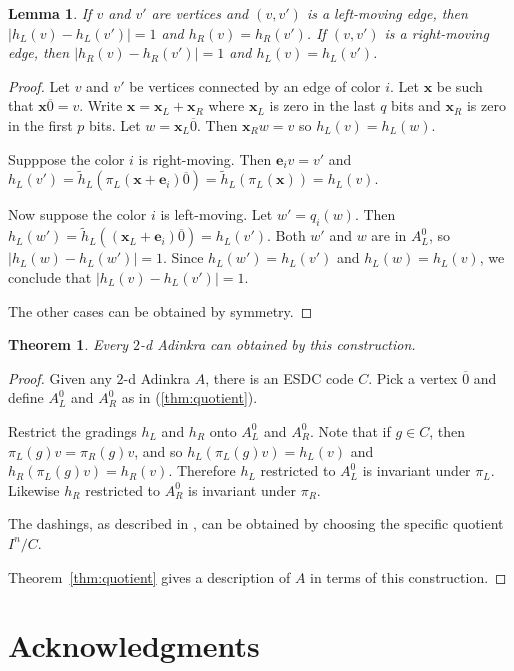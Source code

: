 \documentclass[12pt,twoside,singlespace]{article}
\numberwithin{equation}{section}
\newtheorem{thm}[equation]{Theorem}
\newtheorem{lem}[equation]{Lemma}
\theoremstyle{definition}
\renewcommand{\vec}[1]{\mathbf{#1}}
\begin{document}
\begin{lem}
If $v$ and $v'$ are vertices and $(v,v')$ is a left-moving edge, then
$|h_L(v)-h_L(v')|=1$ and $h_R(v)=h_R(v')$.  If $(v,v')$ is a right-moving edge, then $|h_R(v)-h_R(v')|=1$ and $h_L(v)=h_L(v')$.
\end{lem}

\begin{proof}
Let $v$ and $v'$ be vertices connected by an edge of color $i$.  Let $\vec{x}$ be such that $\vec{x}\overline{0}=v$.  Write $\vec{x}=\vec{x}_L+\vec{x}_R$ where $\vec{x}_L$ is zero in the last $q$ bits and $\vec{x}_R$ is zero in the first $p$ bits.  Let $w=\vec{x}_L\overline{0}$.  Then $\vec{x}_R w = v$ so $h_L(v)=h_L(w)$.

Supppose the color $i$ is right-moving.  Then $\vec{e}_i v = v'$ and $h_L(v')=\tilde{h}_L(\pi_L(\vec{x}+\vec{e}_i)\overline{0})=\tilde{h}_L(\pi_L(\vec{x}))=h_L(v)$.


Now suppose the color $i$ is left-moving.  Let $w'=q_i(w)$.  Then 
$h_L(w')=\tilde{h}_L((\vec{x}_L+\vec{e}_i)\overline{0})=h_L(v')$.  Both $w'$ and $w$ are in $A_L^0$, so $|h_L(w)-h_L(w')|=1$.  Since $h_L(w')=h_L(v')$ and $h_L(w)=h_L(v)$, we conclude that $|h_L(v)-h_L(v')|=1$.

The other cases can be obtained by symmetry.
\end{proof}


\begin{thm}
Every $2$-d Adinkra can obtained by this construction.
\end{thm}

\begin{proof}
Given any $2$-d Adinkra $A$, there is an ESDC code $C$.  Pick a vertex $\overline{0}$ and define $A_L^0$ and $A_R^0$ as in (\ref{thm:quotient}).

Restrict the gradings $h_L$ and $h_R$ onto $A_L^0$ and $A_R^0$.  Note that if $g\in C$, then $\pi_L(g)v=\pi_R(g)v$, and so $h_L(\pi_L(g)v)=h_L(v)$ and $h_R(\pi_L(g)v)=h_R(v)$.  Therefore $h_L$ restricted to $A_L^0$ is invariant under $\pi_L$.  Likewise $h_R$ restricted to $A_R^0$ is invariant under $\pi_R$.

The dashings, as described in \cite{d2l:topology}, can be obtained by choosing the specific quotient $I^n/C$.

Theorem~\ref{thm:quotient} gives a description of $A$ in terms of this construction.

\end{proof}


\section*{Acknowledgments}
\end{document}

